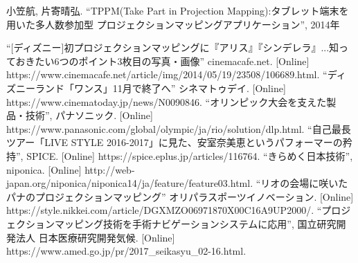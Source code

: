 \begin{thebibliography}{99}
\thispagestyle{fancy}

 小笠航, 片寄晴弘. ``TPPM(Take Part in Projection Mapping):タブレット端末を用いた多人数参加型 プロジェクションマッピングアプリケーション'', 2014年

 ``[ディズニー]初プロジェクションマッピングに『アリス』『シンデレラ』...知っておきたい6つのポイント3枚目の写真・画像'' cinemacafe.net. [Online] https://www.cinemacafe.net/article/img/2014/05/19/23508/106689.html.
 ``ディズニーランド「ワンス」11月で終了へ'' シネマトゥデイ. [Online] https://www.cinematoday.jp/news/N0090846.
 ``オリンピック大会を支えた製品・技術'', パナソニック. [Online]  https://www.panasonic.com/global/olympic/ja/rio/solution/dlp.html.
 ``自己最長ツアー「LIVE STYLE 2016-2017」に見た、安室奈美恵というパフォーマーの矜持'', SPICE. [Online] https://spice.eplus.jp/articles/116764.
 ``きらめく日本技術'', niponica. [Online] http://web-japan.org/niponica/niponica14/ja/feature/feature03.html.
 ``リオの会場に咲いたパナのプロジェクションマッピング'' オリパラスポーツイノベーション. [Online] https://style.nikkei.com/article/DGXMZO06971870X00C16A9UP2000/.
 ``プロジェクションマッピング技術を手術ナビゲーションシステムに応用'', 国立研究開発法人 日本医療研究開発気候. [Online] https://www.amed.go.jp/pr/2017\_seikasyu\_02-16.html.



\end{thebibliography}
